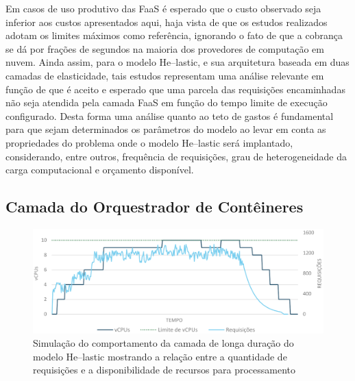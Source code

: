 \documentclass[english,brazilian]{UNISINOSmonografia} %
\newcommand\defaultFigureWidth{0.9}
\begin{document}
Em casos de uso produtivo das FaaS é esperado que o custo observado seja inferior aos custos apresentados aqui, haja vista de que os estudos realizados adotam os limites máximos como referência, ignorando o fato de que a cobrança se dá por frações de segundos na maioria dos provedores de computação em nuvem.
Ainda assim, para o modelo \textsf{He}--lastic, e sua arquitetura baseada em duas camadas de elasticidade, tais estudos representam uma análise relevante em função de que é aceito e esperado que uma parcela das requisições encaminhadas não seja atendida pela camada FaaS em função do tempo limite de execução configurado.
Desta forma uma análise quanto ao teto de gastos é fundamental para que sejam determinados os parâmetros do modelo ao levar em conta as propriedades do problema onde o modelo \textsf{He}--lastic será implantado, considerando, entre outros, frequência de requisições, grau de heterogeneidade da carga computacional e orçamento disponível.


\subsection{Camada do Orquestrador de Contêineres}


\begin{figure}[tb]
	\centering%
	\begin{minipage}{\defaultFigureWidth\textwidth}
		\caption{Simulação do comportamento da camada de longa duração do modelo \textsf{He}--lastic mostrando a relação entre a quantidade de requisições e a disponibilidade de recursos para processamento}
		\label{fig:modelo-custben-container}
		\includegraphics[width=\textwidth]{modelo-custben-container}
	\end{minipage}
\end{figure}
\end{document}
